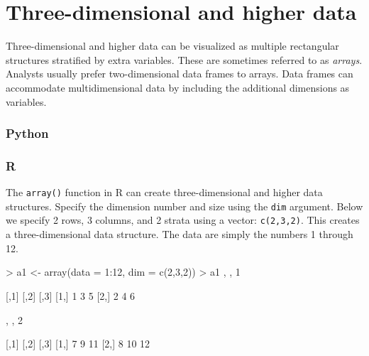 \documentclass[
]{book}
\newenvironment{Shaded}{\begin{snugshade}}{\end{snugshade}}
\newcommand{\AttributeTok}[1]{\textcolor[rgb]{0.77,0.63,0.00}{#1}}
\newcommand{\DecValTok}[1]{\textcolor[rgb]{0.00,0.00,0.81}{#1}}
\newcommand{\FunctionTok}[1]{\textcolor[rgb]{0.00,0.00,0.00}{#1}}
\newcommand{\NormalTok}[1]{#1}
\newcommand{\OtherTok}[1]{\textcolor[rgb]{0.56,0.35,0.01}{#1}}
\newcommand{\SpecialCharTok}[1]{\textcolor[rgb]{0.00,0.00,0.00}{#1}}
\begin{document}
\hypertarget{three-dimensional-and-higher-data}{%
\section{Three-dimensional and higher data}\label{three-dimensional-and-higher-data}}

Three-dimensional and higher data can be visualized as multiple rectangular structures stratified by extra variables. These are sometimes referred to as \emph{arrays}. Analysts usually prefer two-dimensional data frames to arrays. Data frames can accommodate multidimensional data by including the additional dimensions as variables.

\hypertarget{python-9}{%
\subsubsection*{Python}\label{python-9}}

\hypertarget{r-9}{%
\subsubsection*{R}\label{r-9}}

The \texttt{array()} function in R can create three-dimensional and higher data structures. Specify the dimension number and size using the \texttt{dim} argument. Below we specify 2 rows, 3 columns, and 2 strata using a vector: \texttt{c(2,3,2)}. This creates a three-dimensional data structure. The data are simply the numbers 1 through 12.

\begin{Shaded}
\begin{Highlighting}[]
\SpecialCharTok{\textgreater{}}\NormalTok{ a1 }\OtherTok{\textless{}{-}} \FunctionTok{array}\NormalTok{(}\AttributeTok{data =} \DecValTok{1}\SpecialCharTok{:}\DecValTok{12}\NormalTok{, }\AttributeTok{dim =} \FunctionTok{c}\NormalTok{(}\DecValTok{2}\NormalTok{,}\DecValTok{3}\NormalTok{,}\DecValTok{2}\NormalTok{))}
\SpecialCharTok{\textgreater{}}\NormalTok{ a1}
\NormalTok{, , }\DecValTok{1}

\NormalTok{     [,}\DecValTok{1}\NormalTok{] [,}\DecValTok{2}\NormalTok{] [,}\DecValTok{3}\NormalTok{]}
\NormalTok{[}\DecValTok{1}\NormalTok{,]    }\DecValTok{1}    \DecValTok{3}    \DecValTok{5}
\NormalTok{[}\DecValTok{2}\NormalTok{,]    }\DecValTok{2}    \DecValTok{4}    \DecValTok{6}

\NormalTok{, , }\DecValTok{2}

\NormalTok{     [,}\DecValTok{1}\NormalTok{] [,}\DecValTok{2}\NormalTok{] [,}\DecValTok{3}\NormalTok{]}
\NormalTok{[}\DecValTok{1}\NormalTok{,]    }\DecValTok{7}    \DecValTok{9}   \DecValTok{11}
\NormalTok{[}\DecValTok{2}\NormalTok{,]    }\DecValTok{8}   \DecValTok{10}   \DecValTok{12}
\end{Highlighting}
\end{Shaded}
\end{document}
